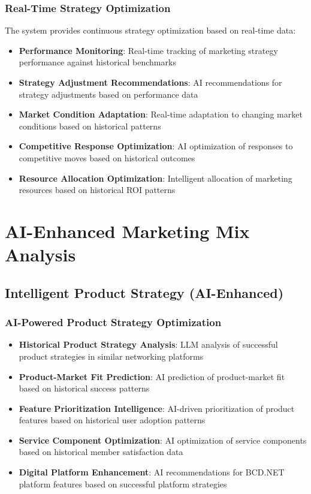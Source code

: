 \subsubsection{Real-Time Strategy Optimization}

The system provides continuous strategy optimization based on real-time data:

\begin{itemize}
    \item \textbf{Performance Monitoring}: Real-time tracking of marketing strategy performance against historical benchmarks
    \item \textbf{Strategy Adjustment Recommendations}: AI recommendations for strategy adjustments based on performance data
    \item \textbf{Market Condition Adaptation}: Real-time adaptation to changing market conditions based on historical patterns
    \item \textbf{Competitive Response Optimization}: AI optimization of responses to competitive moves based on historical outcomes
    \item \textbf{Resource Allocation Optimization}: Intelligent allocation of marketing resources based on historical ROI patterns
\end{itemize}

\section{AI-Enhanced Marketing Mix Analysis}

\subsection{Intelligent Product Strategy (AI-Enhanced)}

\subsubsection{AI-Powered Product Strategy Optimization}

\begin{itemize}
    \item \textbf{Historical Product Strategy Analysis}: LLM analysis of successful product strategies in similar networking platforms
    \item \textbf{Product-Market Fit Prediction}: AI prediction of product-market fit based on historical success patterns
    \item \textbf{Feature Prioritization Intelligence}: AI-driven prioritization of product features based on historical user adoption patterns
    \item \textbf{Service Component Optimization}: AI optimization of service components based on historical member satisfaction data
    \item \textbf{Digital Platform Enhancement}: AI recommendations for BCD.NET platform features based on successful platform strategies
\end{itemize}

